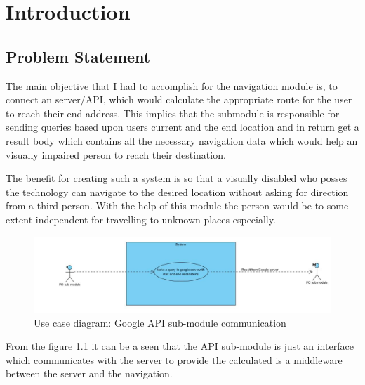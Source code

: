 \newpage
\chapter{Introduction}
	\section{Problem Statement}
		The main objective that I had to accomplish for the navigation module is, to connect an 
		server/API, which would calculate the appropriate route for the user to reach their end address. 
		This implies that the submodule is responsible for sending queries based upon users 
		current and the end location and in return get a result body which contains
		all the necessary navigation data which would help an visually impaired person to reach their 
		destination.
		
		\par
			The benefit for creating such a system is so that a visually disabled who posses
			the technology can navigate to the desired location without asking for direction
			from a third person. With the help of this module the person would be
			to some extent independent for travelling to unknown places especially. 
	
		\begin{figure}[htbp!]
			\centering \includegraphics[scale=0.65]{grafiken/googleServerCommunication.jpg}
			\caption{Use case diagram: Google API sub-module communication}
			\label{fig:Google API communication}
		\end{figure}

	\par
		From the figure \ref{fig:Google API communication} it can be a seen that the API sub-module is 
		just an interface which communicates with the server to provide the calculated is a 
		middleware between the server and the navigation.

